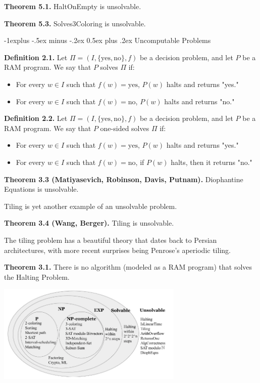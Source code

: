 \documentclass[10pt,landscape]{article}
\makeatletter
\renewcommand{\subsection}{\@startsection{subsection}{2}{0mm}%
                                {-1explus -.5ex minus -.2ex}%
                                {0.5ex plus .2ex}%
                                {\normalfont\normalsize\bfseries}}
\makeatother
\begin{document}
\begin{multicols*}{3}
\textbf{Theorem 5.1.} HaltOnEmpty is unsolvable.

\textbf{Theorem 5.3.} Solves3Coloring is unsolvable.

\subsection{Uncomputable Problems}

\textbf{Definition 2.1.} Let $\Pi = (I, \{ \text{yes}, \text{no} \}, f)$ be a decision problem, and let $P$ be a RAM program. We say that $P$ solves $\Pi$ if:

\begin{itemize}
  \item For every $w \in I$ such that $f(w) = \text{yes}$, $P(w)$ halts and returns "yes."
  \item For every $w \in I$ such that $f(w) = \text{no}$, $P(w)$ halts and returns "no."
\end{itemize}

\textbf{Definition 2.2.} Let $\Pi = (I, \{ \text{yes}, \text{no} \}, f)$ be a decision problem, and let $P$ be a RAM program. We say that $P$ one-sided solves $\Pi$ if:

\begin{itemize}
  \item For every $w \in I$ such that $f(w) = \text{yes}$, $P(w)$ halts and returns "yes."
  \item For every $w \in I$ such that $f(w) = \text{no}$, if $P(w)$ halts, then it returns "no."
\end{itemize}


\textbf{Theorem 3.3 (Matiyasevich, Robinson, Davis, Putnam).} Diophantine Equations is unsolvable.

Tiling is yet another example of an unsolvable problem.

\textbf{Theorem 3.4 (Wang, Berger).} Tiling is unsolvable.

The tiling problem has a beautiful theory that dates back to Persian architectures, with more recent surprises being Penrose’s aperiodic tiling.

\textbf{Theorem 3.1.} There is no algorithm (modeled as a RAM program) that solves the Halting Problem.

\begin{minipage}{\linewidth}
            \centering
\includegraphics[width=3.5in]{figures/table.png}
        \end{minipage}

\vspace{1.5in}

\end{multicols*}
\end{document}
